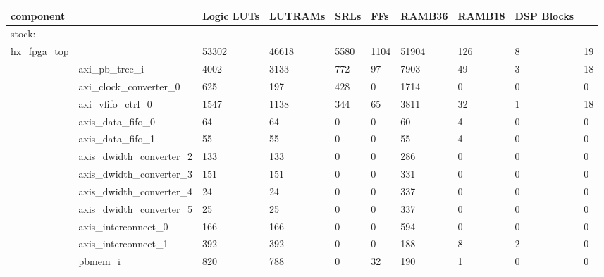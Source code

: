 \begin{table}
  \begin{center}
\begin{tabular}{llllllllll}
  \toprule
  component & & Logic LUTs & LUTRAMs & SRLs &  FFs  & RAMB36 & RAMB18 & DSP Blocks \\
  \midrule
  stock: \\
 hx\_fpga\_top                                      &  &      53302 &      46618 &    5580 & 1104 & 51904 &    126 &      8 &         19 \\
&    axi\_pb\_trce\_i                                    &       4002 &       3133 &     772 &   97 &  7903 &     49 &      3 &         18 \\
&      axi\_clock\_converter\_0                          &        625 &        197 &     428 &    0 &  1714 &      0 &      0 &          0 \\
&      axi\_vfifo\_ctrl\_0                               &       1547 &       1138 &     344 &   65 &  3811 &     32 &      1 &         18 \\
&      axis\_data\_fifo\_0                               &         64 &         64 &       0 &    0 &    60 &      4 &      0 &          0 \\
&      axis\_data\_fifo\_1                               &         55 &         55 &       0 &    0 &    55 &      4 &      0 &          0 \\
&      axis\_dwidth\_converter\_2                        &        133 &        133 &       0 &    0 &   286 &      0 &      0 &          0 \\
&      axis\_dwidth\_converter\_3                        &        151 &        151 &       0 &    0 &   331 &      0 &      0 &          0 \\
&      axis\_dwidth\_converter\_4                        &         24 &         24 &       0 &    0 &   337 &      0 &      0 &          0 \\
&      axis\_dwidth\_converter\_5                        &         25 &         25 &       0 &    0 &   337 &      0 &      0 &          0 \\
&      axis\_interconnect\_0                            &        166 &        166 &       0 &    0 &   594 &      0 &      0 &          0 \\
&      axis\_interconnect\_1                            &        392 &        392 &       0 &    0 &   188 &      8 &      2 &          0 \\
&      pbmem\_i                                        &        820 &        788 &       0 &   32 &   190 &      1 &      0 &          0 \\

\end{tabular}
\end{center}
\end{table}
